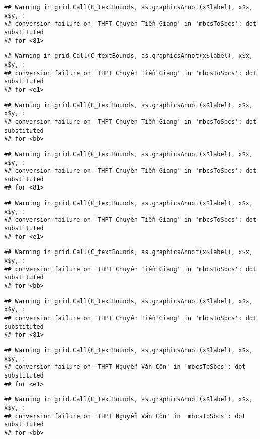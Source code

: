 \documentclass[
]{article}
\begin{document}
\begin{verbatim}
## Warning in grid.Call(C_textBounds, as.graphicsAnnot(x$label), x$x, x$y, :
## conversion failure on 'THPT Chuyên Tiền Giang' in 'mbcsToSbcs': dot substituted
## for <81>
\end{verbatim}

\begin{verbatim}
## Warning in grid.Call(C_textBounds, as.graphicsAnnot(x$label), x$x, x$y, :
## conversion failure on 'THPT Chuyên Tiền Giang' in 'mbcsToSbcs': dot substituted
## for <e1>
\end{verbatim}

\begin{verbatim}
## Warning in grid.Call(C_textBounds, as.graphicsAnnot(x$label), x$x, x$y, :
## conversion failure on 'THPT Chuyên Tiền Giang' in 'mbcsToSbcs': dot substituted
## for <bb>
\end{verbatim}

\begin{verbatim}
## Warning in grid.Call(C_textBounds, as.graphicsAnnot(x$label), x$x, x$y, :
## conversion failure on 'THPT Chuyên Tiền Giang' in 'mbcsToSbcs': dot substituted
## for <81>
\end{verbatim}

\begin{verbatim}
## Warning in grid.Call(C_textBounds, as.graphicsAnnot(x$label), x$x, x$y, :
## conversion failure on 'THPT Chuyên Tiền Giang' in 'mbcsToSbcs': dot substituted
## for <e1>
\end{verbatim}

\begin{verbatim}
## Warning in grid.Call(C_textBounds, as.graphicsAnnot(x$label), x$x, x$y, :
## conversion failure on 'THPT Chuyên Tiền Giang' in 'mbcsToSbcs': dot substituted
## for <bb>
\end{verbatim}

\begin{verbatim}
## Warning in grid.Call(C_textBounds, as.graphicsAnnot(x$label), x$x, x$y, :
## conversion failure on 'THPT Chuyên Tiền Giang' in 'mbcsToSbcs': dot substituted
## for <81>
\end{verbatim}

\begin{verbatim}
## Warning in grid.Call(C_textBounds, as.graphicsAnnot(x$label), x$x, x$y, :
## conversion failure on 'THPT Nguyễn Văn Côn' in 'mbcsToSbcs': dot substituted
## for <e1>
\end{verbatim}

\begin{verbatim}
## Warning in grid.Call(C_textBounds, as.graphicsAnnot(x$label), x$x, x$y, :
## conversion failure on 'THPT Nguyễn Văn Côn' in 'mbcsToSbcs': dot substituted
## for <bb>
\end{verbatim}
\end{document}
